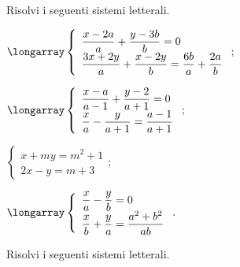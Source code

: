 \begin{esercizio}[\Ast] %
 \label{ese:21.80}
 Risolvi i seguenti sistemi letterali.
\begin{multicols}{2}
\begin{enumeratea}
\item $\longarray\left\{\begin{array}{l}\dfrac{x-2a}{a}+\dfrac{y-3b}{b}=0\\\dfrac{3x+2y}{a}+\dfrac{x-2y}{b}=
\dfrac{6b}{a}+\dfrac{2a}{b}\end{array}\right.;$
\item $\longarray\left\{\begin{array}{l}\dfrac{x-a}{a-1}+\dfrac{y-2}{a+1}=0\\\dfrac{x}{a}-\dfrac{y}{a+1}=
\dfrac{a-1}{a+1}\end{array}\right.;$
\item $\left\{\begin{array}{l}x+my=m^{2}+1\\2x-y=m+3 \end{array}\right.;$
\item $\longarray\left\{\begin{array}{l}\dfrac{x}{a}-\dfrac{y}{b}=0\\\dfrac{x}{b}+\dfrac{y}{a}=\dfrac{a^{2}+b^{2}}{ab} \end{array}\right..$
\end{enumeratea}
\end{multicols}
\end{esercizio}

\begin{esercizio}[\Ast] %
 \label{ese:21.81}
 Risolvi i seguenti sistemi letterali.
\begin{multicols}{2}
\begin{enumeratea}
\end{enumeratea}
\end{multicols}
\end{esercizio}

